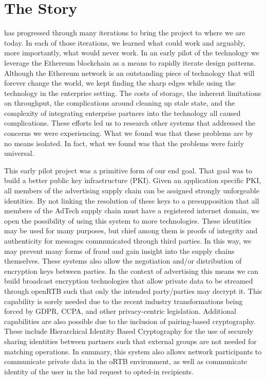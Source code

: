 \section{The Story}

\LayerTwoLong{} has progressed through many iterations to bring the project
to where we are today.
In each of those iterations, we learned what could work and arguably,
more importantly, what would never work.
In an early pilot of the technology we leverage the Ethereum blockchain
as a means to rapidly iterate design patterns.
Although the Ethereum network is an outstanding piece of technology
that will forever change the world, we kept finding the sharp edges
while using the technology in the enterprise setting.
The costs of storage, the inherent limitations on throughput, the
complications around cleaning up stale state, and the complexity of
integrating enterprise partners into the technology all caused
complications.
These efforts led us to research other systems that addressed the
concerns we were experiencing.
What we found was that these problems are by no means isolated.
In fact, what we found was that the problems were fairly universal.

This early pilot project was a primitive form of our end goal.
That goal was to build a better public key infrastructure (PKI).
Given an application specific PKI, all members of the advertising
supply chain can be assigned strongly unforgeable identities.
By not linking the resolution of these keys to a presupposition that
all members of the AdTech supply chain must have a registered internet
domain, we open the possibility of using this system to more
technologies.
These identities may be used for many purposes, but chief among them is
proofs of integrity and authenticity for messages communicated through
third parties.
In this way, we may prevent many forms of fraud and gain insight into
the supply chains themselves.
These systems also allow the negotiation and/or distribution of
encryption keys between parties.
In the context of advertising this means we can build broadcast
encryption technologies that allow private data to be streamed through
openRTB such that only the intended party/parties may decrypt it.
This capability is sorely needed due to the recent industry
transformations being forced by GDPR, CCPA, and other privacy-centric
legislation.
Additional capabilities are also possible due to the inclusion of
pairing-based cryptography.
These include Hierarchical Identity Based Cryptography for the use of
securely sharing identities between partners such that external groups
are not needed for matching operations.
In summary, this system also allows network participants to communicate
private data in the oRTB environment, as well as communicate identity
of the user in the bid request to opted-in recipients.

